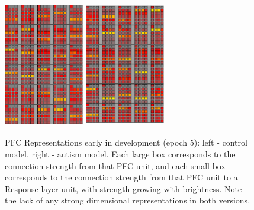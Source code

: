 \begin{figure}[t]
\begin{center}
	\includegraphics[width=35mm,height=55mm]{graphs/PFCwts1.05.eps}
	\hspace{18 mm}
	\includegraphics[width=35mm,height=55mm]{graphs/PFCwts54.05.eps}
\end{center}
\caption{PFC Representations early in development
         (epoch 5): left - control model, right -
         autism model.  Each large box corresponds to the connection strength from that PFC unit, and each small box corresponds to the connection strength from that PFC unit to a Response layer unit, with strength growing with brightness.  Note the lack of any strong dimensional representations in both versions.}
\label{rep1-figure}
\end{figure} 

